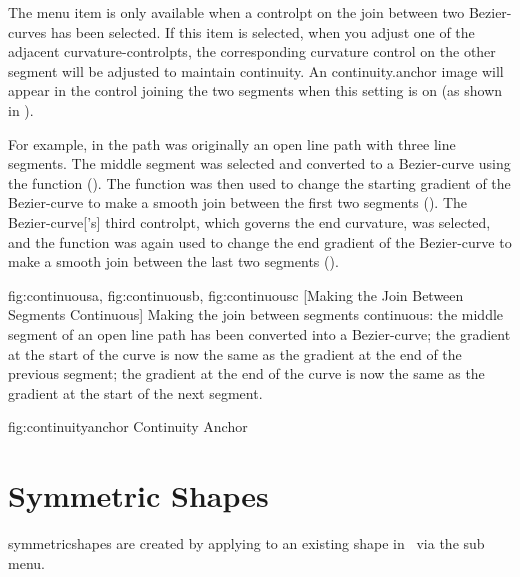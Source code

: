The  menu item is only available
when a \gls*{controlpt} on the join between two \glspl{Bezier-curve}
has been selected. If this item is selected, when you adjust one of
the adjacent \glspl{curvature-controlpt}, the corresponding curvature
control on the other segment will be adjusted to maintain
\gls{continuity}. An \gls{continuity.anchor} image will appear in the control joining the
two segments when this setting is on (as shown in
).

For example, in  the path was originally
an open line \gls{path} with three line segments.  The middle segment was
selected and converted to a \gls{Bezier-curve} using the
 function
(). The
 function was then
used to change the starting \gls{gradient} of the \gls{Bezier-curve} to make
a smooth join between the first two segments
().  The \gls{Bezier-curve}['s] third
\gls*{controlpt}, which governs the end curvature, was selected, and
the  function was
again used to change the end \gls{gradient} of the \gls{Bezier-curve} to
make a smooth join between the last two segments
().

{
 {fig:continuousa}{}{},
 {fig:continuousb}{}{},
 {fig:continuousc}{}{}
}
[Making the Join Between Segments Continuous]
{Making the join between segments continuous: 
 the middle segment of
an open line path has been converted into a \gls{Bezier-curve};
 the gradient at the start of the curve is now the same as
the gradient at the end of the previous segment; 
 the
gradient at the end of the curve is now the same as the gradient at
the start of the next segment.}

\FloatFig
  {fig:continuityanchor}
   {}
   {Continuity Anchor}


\section{Symmetric Shapes}\label{sec:symmetric}

\Glspl{symmetricshape} are created by applying
 to an existing \gls{shape} in 
\editpathmode\ via the  sub menu.

